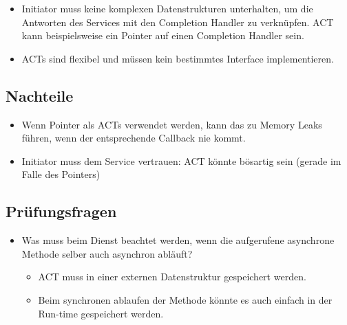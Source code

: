 \begin{itemize}
	\item Initiator muss keine komplexen Datenstrukturen unterhalten, um die Antworten des Services mit den Completion Handler zu verknüpfen. ACT kann beispielsweise ein Pointer auf einen Completion Handler sein.
	\item ACTs sind flexibel und müssen kein bestimmtes Interface implementieren.
\end{itemize}

\subsection{Nachteile}

\begin{itemize}
	\item Wenn Pointer als ACTs verwendet werden, kann das zu Memory Leaks führen, wenn der entsprechende Callback nie kommt.
	\item Initiator muss dem Service vertrauen: ACT könnte bösartig sein (gerade im Falle des Pointers)
\end{itemize}


\subsection{Prüfungsfragen}

\begin{itemize}
	\item Was muss beim Dienst beachtet werden, wenn die aufgerufene asynchrone Methode selber auch asynchron abläuft?
	\begin{itemize}
		\item ACT muss in einer externen Datenstruktur gespeichert werden.
		\item Beim synchronen ablaufen der Methode könnte es auch einfach in der Run-time gespeichert werden.
	\end{itemize}
\end{itemize}
